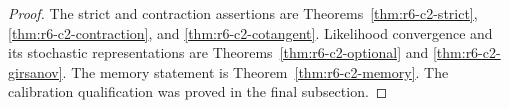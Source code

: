 \begin{proof}
The strict and contraction assertions are
Theorems~\ref{thm:r6-c2-strict},
\ref{thm:r6-c2-contraction}, and
\ref{thm:r6-c2-cotangent}.  Likelihood convergence and its stochastic
representations are Theorems~\ref{thm:r6-c2-optional} and
\ref{thm:r6-c2-girsanov}.  The memory statement is
Theorem~\ref{thm:r6-c2-memory}.  The calibration qualification was proved in
the final subsection.
\end{proof}
